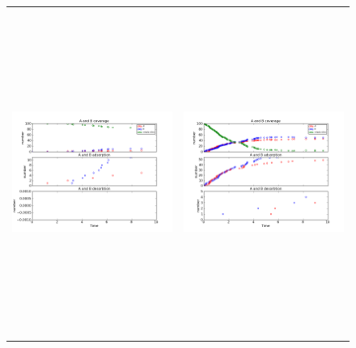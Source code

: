 \documentclass[11pt]{article}
\begin{document}
\setlength{\unitlength}{1in}
\begin{figure}[h!]
\begin{tabular}{cc}
\includegraphics[width=3.5in, height=4.2in]{./coadsorb/AtoBcoadsorb10x10_101_desorb2x__Ea5E3_Ed10E3_1.png} &
\includegraphics[width=3.5in, height=4.2in]{./coadsorb/AtoBcoadsorb10x10_201_desorb2x__Ea5E3_Ed10E3_1.png} \\

\end{tabular}
\end{figure}
\end{document}
